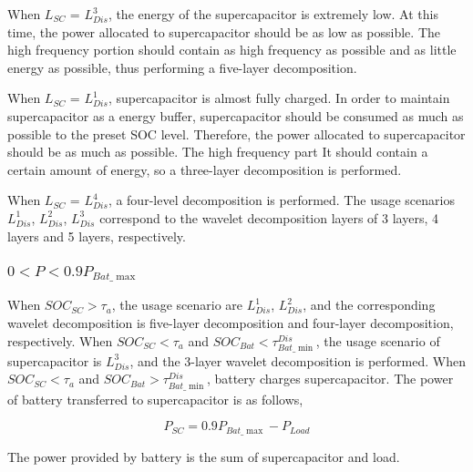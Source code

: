 \documentclass[energies,article,submit,moreauthors,pdftex,10pt,a4paper]{Definitions/mdpi}
\begin{document}
When ${L_{SC}}$ = $ L_{Dis}^3$, the energy of the supercapacitor is extremely low. 
At this time, the power allocated to supercapacitor should be as low as possible. The high frequency portion should contain as high frequency as possible and as little energy as possible, thus performing a five-layer decomposition. 

When ${L_{SC}}$ = $ L_{Dis}^1$, supercapacitor is almost fully charged. In order to maintain supercapacitor as a energy buffer, supercapacitor should be consumed as much as possible to the preset SOC level. Therefore, the power allocated to supercapacitor should be as much as possible. The high frequency part It should contain a certain amount of energy, so a three-layer decomposition is performed. 

When ${L_{SC}}$ = $ L_{Dis}^4$, a four-level decomposition is performed.
The usage scenarios $ L_{Dis}^1$, $ L_{Dis}^2$, $ L_{Dis}^3$ correspond to the wavelet decomposition layers of 3 layers, 4 layers and 5 layers, respectively.

\subsubsection{${0<P<0.9P_{Bat\_\max }}$}
When ${SOC _{SC}>\tau _{a}}$, the usage scenario are $ L_{Dis}^1$, $ L_{Dis}^2$, and the corresponding wavelet decomposition is five-layer decomposition and four-layer decomposition, respectively.
When ${SOC _{SC}<\tau _{a}}$ and ${SOC _{Bat}<\tau_{Bat\_\min }^{Dis}}$, the usage scenario of supercapacitor is $ L_{Dis}^3$, and the 3-layer wavelet decomposition is performed.
When ${SOC _{SC}<\tau _{a}}$ and ${SOC _{Bat}>\tau_{Bat\_\min }^{Dis}}$, battery charges supercapacitor.
The power of battery transferred to supercapacitor is as follows,

\begin{equation}
{P_{SC}} = 0.9{P_{Bat\_\max }} - {P_{Load}}
\end{equation}

The power provided by battery is the sum of supercapacitor and load.
\end{document}
